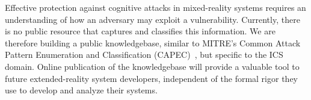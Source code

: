 Effective protection against cognitive attacks in mixed-reality systems requires an understanding of how an adversary may exploit a vulnerability. Currently, there is no public resource that captures and classifies this information. We are therefore building a public knowledgebase, similar to MITRE’s Common Attack Pattern Enumeration and Classification (CAPEC)~\cite{??}, but specific to the ICS domain. Online publication of the knowledgebase will provide a valuable tool to future extended-reality system developers, independent of the formal rigor they use to develop and analyze their systems.